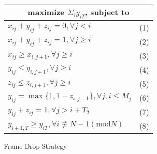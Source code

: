 \begin{figure}[tb]
\centering
{\setlength{\tabcolsep}{3pt}
\begin{tabular}{|l|l|}
\hline
\multicolumn{2}{|c|}{ maximize $\Sigma_i y_{iT}$, subject to} \\ \hline \hline
 $x_{ij}+y_{ij}+z_{ij} = 0, \forall j<i$       & (1)        \\
 $x_{ij}+y_{ij}+z_{ij} = 1, \forall j\geq i$   & (2)       \\
 $x_{ij} \geq x_{i,j+1}, \forall j\geq i$      & (3)        \\
 $y_{ij} \leq y_{i,j+1}, \forall j\geq i$      & (4)        \\
 $z_{ij} \leq z_{i,j+1}, \forall j\geq i$      & (5)        \\ \hline
 $y_{ij} = \max\{1,{1-z_{i,j-1}}\}, \forall j, i \leq M_{j}$  & (6)   \\ \hline
 $y_{ij}+z_{ij} = 1 ,\forall j>i+T_2$          & (7)        \\ \hline
 $y_{i+1,T} \geq y_{iT}, \forall i \not\equiv N-1 (\text{mod}N)$ &(8) \\ \hline
\end{tabular}}
\caption{Frame Drop Strategy}
\label{fig:ip-program} 
\end{figure}
